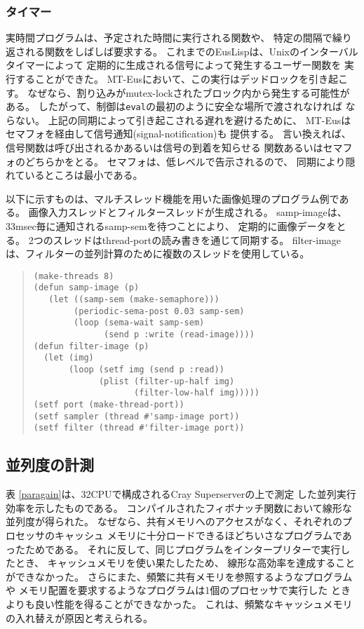 \subsubsection{タイマー}
実時間プログラムは、予定された時間に実行される関数や、
特定の間隔で繰り返される関数をしばしば要求する。
これまでのEusLispは、Unixのインターバルタイマーによって
定期的に生成される信号によって発生するユーザー関数を
実行することができた。
MT-Eusにおいて、この実行はデッドロックを引き起こす。
なぜなら、割り込みがmutex-lockされたブロック内から発生する可能性がある。
したがって、制御は{\tt eval}の最初のように安全な場所で渡されなければ
ならない。
上記の同期によって引き起こされる遅れを避けるために、
MT-Eusはセマフォを経由して信号通知(signal-notification)も
提供する。
言い換えれば、信号関数は呼び出されるかあるいは信号の到着を知らせる
関数あるいはセマフォのどちらかをとる。
セマフォは、低レベルで告示されるので、
同期により隠れているところは最小である。

以下に示すものは、マルチスレッド機能を用いた画像処理のプログラム例である。
画像入力スレッドとフィルタースレッドが生成される。
samp-imageは、33msec毎に通知されるsamp-semを待つことにより、
定期的に画像データをとる。
2つのスレッドはthread-portの読み書きを通じて同期する。
filter-imageは、フィルターの並列計算のために複数のスレッドを使用している。

\begin{quote}
\begin{verbatim}
(make-threads 8)
(defun samp-image (p)
   (let ((samp-sem (make-semaphore)))
        (periodic-sema-post 0.03 samp-sem)
        (loop (sema-wait samp-sem)
              (send p :write (read-image))))
(defun filter-image (p)
  (let (img)
       (loop (setf img (send p :read))
             (plist (filter-up-half img)
                    (filter-low-half img)))))
(setf port (make-thread-port))
(setf sampler (thread #'samp-image port))
(setf filter (thread #'filter-image port))
\end{verbatim}
\end{quote}

\subsection{並列度の計測}

表 \ref{paragain}は、32CPUで構成されるCray Superserverの上で測定
した並列実行効率を示したものである。
コンパイルされたフィボナッチ関数において線形な並列度が得られた。
なぜなら、共有メモリへのアクセスがなく、それぞれのプロセッサのキャッシュ
メモリに十分ロードできるほどちいさなプログラムであったためである。
それに反して、同じプログラムをインタープリターで実行したとき、
キャッシュメモリを使い果たしたため、
線形な高効率を達成することができなかった。
さらにまた、頻繁に共有メモリを参照するようなプログラムや
メモリ配置を要求するようなプログラムは1個のプロセッサで実行した
ときよりも良い性能を得ることができなかった。
これは、頻繁なキャッシュメモリの入れ替えが原因と考えられる。

